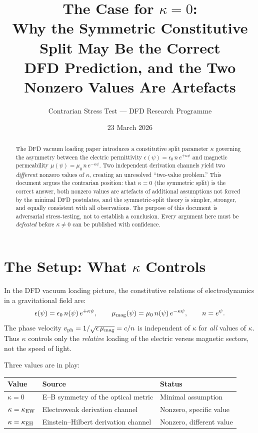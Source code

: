 \documentclass[12pt,a4paper]{article}
\title{The Case for $\kappa = 0$:\\[6pt]
\large Why the Symmetric Constitutive Split May Be the Correct\\
DFD Prediction, and the Two Nonzero Values Are Artefacts}
\author{Contrarian Stress Test --- DFD Research Programme}
\date{23 March 2026}
\theoremstyle{definition}
\theoremstyle{remark}
\begin{document}
\maketitle

\begin{abstract}
The DFD vacuum loading paper introduces a constitutive split parameter
$\kappa$ governing the asymmetry between the electric permittivity
$\epsilon(\psi) = \epsilon_0\, n\, e^{+\kappa\psi}$ and magnetic
permeability $\mu(\psi) = \mu_0\, n\, e^{-\kappa\psi}$.  Two independent
derivation channels yield two \emph{different} nonzero values of $\kappa$,
creating an unresolved ``two-value problem.''  This document argues the
contrarian position: that $\kappa = 0$ (the symmetric split) is the
correct answer, both nonzero values are artefacts of additional assumptions
not forced by the minimal DFD postulates, and the symmetric-split theory
is simpler, stronger, and equally consistent with all observations.
The purpose of this document is adversarial stress-testing, not to
establish a conclusion.  Every argument here must be \emph{defeated}
before $\kappa \neq 0$ can be published with confidence.
\end{abstract}

\tableofcontents
\newpage

\section{The Setup: What $\kappa$ Controls}
\label{sec:setup}

In the DFD vacuum loading picture, the constitutive relations of
electrodynamics in a gravitational field are:
\begin{equation}
\epsilon(\psi) = \epsilon_0\, n(\psi)\, e^{+\kappa\psi}, \qquad
\mu_{\rm mag}(\psi) = \mu_0\, n(\psi)\, e^{-\kappa\psi}, \qquad
n = e^\psi.
\label{eq:constitutive}
\end{equation}
The phase velocity $v_{\rm ph} = 1/\sqrt{\epsilon\,\mu_{\rm mag}} = c/n$
is independent of $\kappa$ for \emph{all} values of $\kappa$.
Thus $\kappa$ controls only the \emph{relative} loading of the
electric versus magnetic sectors, not the speed of light.

Three values are in play:
\begin{center}
\renewcommand{\arraystretch}{1.3}
\begin{tabular}{lll}
\toprule
\textbf{Value} & \textbf{Source} & \textbf{Status} \\
\midrule
$\kappa = 0$ & E--B symmetry of the optical metric & Minimal assumption \\
$\kappa = \kappa_{\rm EW}$ & Electroweak derivation channel & Nonzero, specific value \\
$\kappa = \kappa_{\rm EH}$ & Einstein--Hilbert derivation channel & Nonzero, different value \\
\bottomrule
\end{tabular}
\end{center}
\end{document}

